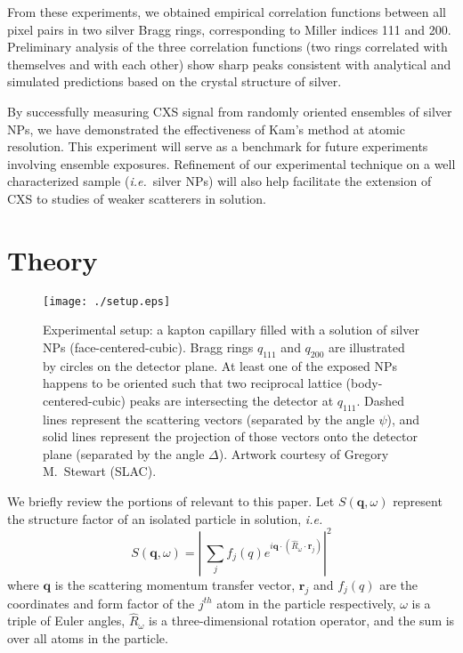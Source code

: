 \documentclass [11pt,fleqn]{article}
\def \be {\begin{equation}}
\def \ee {\end{equation}}
\begin{document}
From these experiments, we obtained empirical correlation functions between all pixel pairs in two silver Bragg rings, corresponding to Miller indices 111 and 200. Preliminary analysis of the three correlation functions (two rings correlated with themselves and with each other) show sharp peaks consistent with analytical and simulated predictions based on the crystal structure of silver.

By successfully measuring CXS signal from randomly oriented ensembles of silver NPs, we have demonstrated the effectiveness of Kam's method at atomic resolution. This experiment will serve as a benchmark for future experiments involving ensemble exposures. Refinement of our experimental technique on a well characterized sample (\textit{i.e.}~silver NPs) will also help facilitate the extension of CXS to studies of weaker scatterers in solution.

\section{Theory}

\begin{figure}
\begin{center}
\texttt{[image: ./setup.eps]}
\end{center}
\caption{Experimental setup: a kapton capillary filled with a solution of silver NPs (face-centered-cubic). Bragg rings $q_{111}$ and $q_{200}$ are illustrated by circles on the detector plane. At least one of the exposed NPs happens to be oriented such that two reciprocal lattice (body-centered-cubic) peaks are intersecting the detector at $q_{111}$. Dashed lines represent the scattering vectors (separated by the angle $\psi$), and solid lines represent the projection of those vectors onto the detector plane (separated by the angle $\Delta$). Artwork courtesy of Gregory M.~Stewart (SLAC).}
\label{fig:setup}
\end{figure}

We briefly review the portions of \cite{Kam:1977wc} relevant to this paper. Let $S( \bm q,\omega)$ represent the structure factor of an isolated particle in solution, \textit{i.e.}
\be \label{structurefactor}
S(\bm q,\omega) = \left| \> \sum_{j} f_j (q )e^{i \bm q \cdot  \left( \hat{R}_\omega \cdot \bm r_j\right)  } \right| ^{2}
\ee
where $\bm q$ is the scattering momentum transfer vector,  $\bm r_j$ and $f_j (q )$ are the coordinates and form factor of the $j^{th}$ atom in the particle respectively, $\omega$ is a triple of Euler angles, $\hat{R}_\omega$ is a three-dimensional rotation operator, and the sum is over all atoms in the particle.
\end{document}
